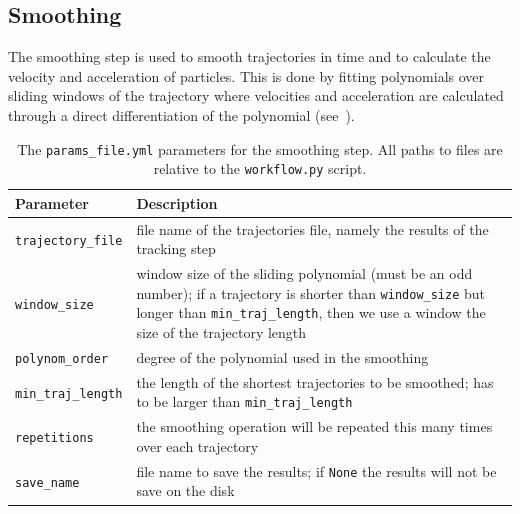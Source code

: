 \documentclass[10pt,a4paper]{article}
\begin{document}
\subsection{Smoothing}\label{sec:workflow_smooth}


The smoothing step is used to smooth trajectories in time and to calculate the velocity and acceleration of particles. This is done by fitting polynomials over sliding windows of the trajectory where velocities and acceleration are calculated through a direct differentiation of the polynomial (see~\cite{Luthi2005}).



\begin{table}[!ht]
	\centering
	\caption{The \texttt{params\_file.yml} parameters for the smoothing step. All paths to files are relative to the \texttt{workflow.py} script.}
	\begin{tabular}{l m{10cm}}
		\hline
		Parameter & Description\\
		\hline
		
		\texttt{trajectory\_file} & file name of the trajectories file, namely the results of the tracking step \\[.5em]
		
		\texttt{window\_size} & window size of the sliding polynomial (must be an odd number); if a trajectory is shorter than \texttt{window\_size} but longer than \texttt{min\_traj\_length}, then we use a window the size of the trajectory length \\[.5em]
		
		\texttt{polynom\_order} & degree of the polynomial used in the smoothing \\[.5em]
		
		\texttt{min\_traj\_length} & the length of the shortest trajectories to be smoothed; has to be larger than \texttt{min\_traj\_length} \\[.5em]
		
		\texttt{repetitions} & the smoothing operation will be repeated this many times over each trajectory \\[.5em]
				
		\texttt{save\_name} & file name to save the results; if \texttt{None} the results will not be save on the disk \\[.5em]
		
		\hline
	\end{tabular}
\end{table}

    
    
\end{document}

